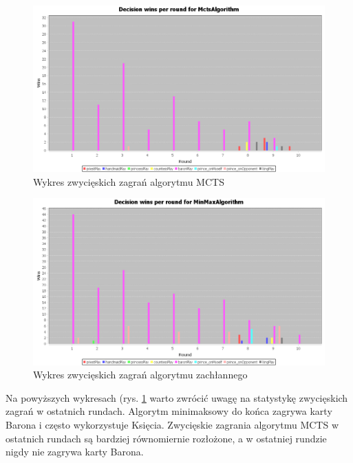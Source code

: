 \begin{figure}[H]
	\centering
	\includegraphics[width=\textwidth]{Resources/MirrorMmVsMcts/MctsVsMmDecision.PNG}
	\caption{Wykres zwycięskich zagrań algorytmu MCTS} 
	\label{fig:MctsVsMmDecision}
\end{figure} 

\begin{figure}[H]
	\centering
	\includegraphics[width=\textwidth]{Resources/MirrorMmVsMcts/MmVsMctsDecision.PNG}
	\caption{Wykres zwycięskich zagrań algorytmu zachłannego} 
	\label{fig:MmVsMctsDecision}
\end{figure} 

Na powyższych wykresach (rys. \ref{fig:MctsVsMmDecision} warto zwrócić uwagę na statystykę zwycięskich zagrań w ostatnich rundach. Algorytm minimaksowy do końca zagrywa karty Barona i często wykorzystuje Księcia. Zwycięskie zagrania algorytmu MCTS w ostatnich rundach są bardziej równomiernie rozłożone, a w ostatniej rundzie nigdy nie zagrywa karty Barona.

